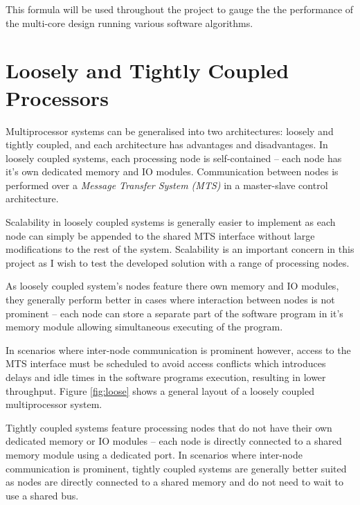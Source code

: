 \documentclass[11pt,a4paper]{report}
\begin{document}
{This formula will be used throughout the project to gauge the the performance of the multi-core design running various software algorithms.

\section{Loosely and Tightly Coupled Processors}
Multiprocessor systems can be generalised into two architectures: loosely and tightly coupled, and each architecture has advantages and disadvantages. 
In loosely coupled systems, each processing node is self-contained -- each node has it's own dedicated memory and IO modules. Communication between nodes is performed over a \textit{Message Transfer System (MTS)} \cite{preeti_aritra_2017}  in a master-slave control architecture.

Scalability in loosely coupled systems is generally easier to implement as each node can simply be appended to the shared MTS interface without large modifications to the rest of the system. Scalability is an important concern in this project as I wish to test the developed solution with a range of processing nodes.

As loosely coupled system's nodes feature there own memory and IO modules, they generally perform better in cases where interaction between nodes is not prominent -- each node can store a separate part of the software program in it's memory module allowing simultaneous executing of the program.

In scenarios where inter-node communication is prominent however, access to the MTS interface must be scheduled to avoid access conflicts which introduces delays and idle times in the software programs execution, resulting in lower throughput. Figure \ref{fig:loose} shows a general layout of a loosely coupled multiprocessor system.

Tightly coupled systems feature processing nodes that do not have their own dedicated memory or IO modules -- each node is directly connected to a shared memory module using a dedicated  port. In scenarios where inter-node communication is prominent, tightly coupled systems are generally better suited as nodes are directly connected to a shared memory and do not need to wait to use a shared bus.

}
\end{document}
